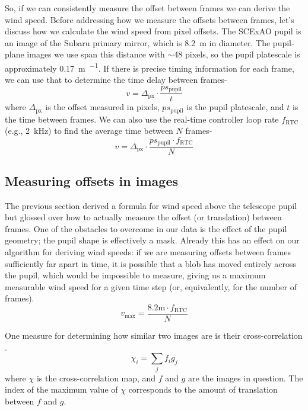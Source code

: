 So, if we can consistently measure the offset between frames we can derive the wind speed. Before addressing how we measure the offsets between frames, let's discuss how we calculate the wind speed from pixel offsets. The SCExAO pupil is an image of the Subaru primary mirror, which is \SI{8.2}{\meter} in diameter. The pupil-plane images we use span this distance with $\sim$48 pixels, so the pupil platescale is approximately \SI{0.17}{\meter\per\pixel}. If there is precise timing information for each frame, we can use that to determine the time delay between frames-
\begin{equation}
    v = \Delta_\mathrm{px} \cdot \frac{ps_\mathrm{pupil}}{t}
\end{equation}
where $\Delta_\mathrm{px}$ is the offset measured in pixels, $ps_\mathrm{pupil}$ is the pupil platescale, and $t$ is the time between frames. We can also use the real-time controller loop rate $f_\mathrm{RTC}$ (e.g., \SI{2}{\kilo\hertz}) to find the average time between $N$ frames-
\begin{equation}
    v = \Delta_\mathrm{px} \cdot \frac{ps_\mathrm{pupil} \cdot f_\mathrm{RTC}}{N}
    \label{eqn:quantity}
\end{equation}

\subsection{Measuring offsets in images}\label{sec:algo}

The previous section derived a formula for wind speed above the telescope pupil but glossed over how to actually measure the offset (or translation) between frames. One of the obstacles to overcome in our data is the effect of the pupil geometry; the pupil shape is effectively a mask. Already this has an effect on our algorithm for deriving wind speeds: if we are measuring offsets between frames sufficiently far apart in time, it is possible that a blob has moved entirely across the pupil, which would be impossible to measure, giving us a maximum measurable wind speed for a given time step (or, equivalently, for the number of frames).
\begin{equation}
    v_{\max} = \frac{8.2\mathrm{ m} \cdot f_\mathrm{RTC}}{N}
    \label{eqn:max}
\end{equation}

One measure for determining how similar two images are is their cross-correlation \citep{1997ApOpt..36.8352F}.
\begin{equation}
    \chi_{i} = \sum_{j}{f_{i}g_{j}}
    \label{eqn:crosscorr}
\end{equation}
where $\chi$ is the cross-correlation map, and $f$ and $g$ are the images in question. The index of the maximum value of $\chi$ corresponds to the amount of translation between $f$ and $g$. 

